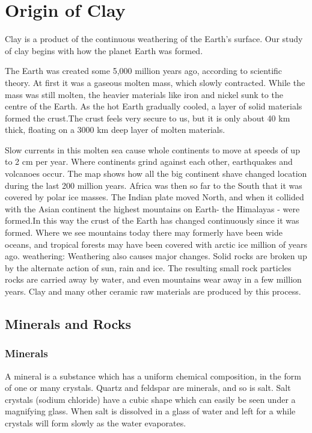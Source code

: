 \chapter{Origin of Clay}
Clay is a product of the continuous weathering of the Earth's surface. Our 
study of clay begins with how the planet Earth was formed.

The Earth was created some 5,000 million years ago, according to scientific 
theory. At first it was a gaseous molten mass, which slowly contracted. While 
the mass was still molten, the heavier materials like iron and nickel sunk to 
the centre of the Earth. As the hot Earth gradually cooled, a layer of solid 
materials formed the crust.The crust feels very secure to us, but it is only 
about 40 km thick, floating on a 3000 km deep layer of molten materials.

Slow currents in this molten sea cause whole continents to move at speeds of up 
to 2 cm per year. Where continents grind against each other, earthquakes and 
volcanoes occur. The map shows how all the big continent shave 
changed location during the last 200 million years. Africa was then so far to 
the South that it was covered by polar ice masses. The Indian plate moved 
North, and when it collided with the Asian continent the highest mountains on 
Earth- the Himalayas - were formed.In this way the crust of the Earth has 
changed continuously since it was formed. Where we see mountains today there 
may formerly have been wide oceans, and tropical forests may have been covered 
with arctic ice million of years ago. weathering: Weathering also causes major 
changes. Solid rocks are broken up by the alternate action of sun, rain and 
ice. The resulting small rock particles rocks are carried away by water, and 
even mountains wear away in a few million years. Clay and many other ceramic 
raw materials are produced by this process.
\section{Minerals and Rocks}
\subsection{Minerals}
A mineral is a substance which has a uniform chemical composition, in the form 
of one or many crystals. Quartz and feldspar are minerals, and so is salt. Salt 
crystals (sodium chloride) have a cubic shape which can easily be seen under a 
magnifying glass. When salt is dissolved in a glass of water and left for a 
while crystals will form slowly as the water evaporates.
